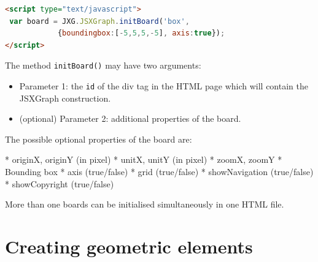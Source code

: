 \documentclass[a4paper]{tufte-book}
\begin{document}
\begin{lstlisting}[language=HTML]
<script type="text/javascript">
 var board = JXG.JSXGraph.initBoard('box', 
            {boundingbox:[-5,5,5,-5], axis:true});
</script>
\end{lstlisting}
The method \lstinline|initBoard()| may have two arguments:
\begin{itemize}
    \item Parameter 1: the \lstinline|id| of the div tag in the HTML page which will contain the JSXGraph construction.
    \item (optional) Parameter 2: additional properties of the board. 
\end{itemize}
The possible optional properties of the board are:

    * originX, originY (in pixel)
    * unitX, unitY (in pixel)
    * zoomX, zoomY
    * Bounding box
    * axis (true/false)
    * grid (true/false)
    * showNavigation (true/false)
    * showCopyright (true/false) 

More than one boards can be initialised simultaneously in one HTML file. 
\chapter{Creating geometric elements}
\end{document}
